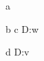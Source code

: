 \documentclass{imsart}
\begin{document}
a
\usepackage{doipkg}
\usepackage{savedoipkg}
b  \foo
\renewcommand{\doi}[1]{D:#1}
c \doi{w}
\usepackage{doipkg}
d \doi{v}
\end{document}
